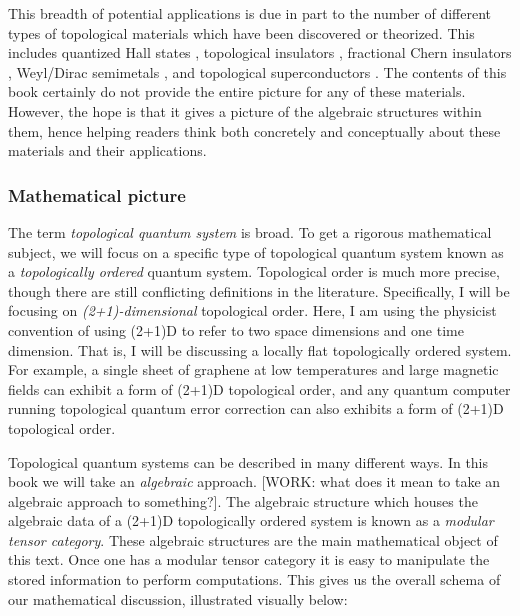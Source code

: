 \documentclass{article}
\theoremstyle{definition}
\newcommand{\0}{\left|0\right>}
\newcommand{\1}{\left|1\right>}
\numberwithin{figure}{section}
\begin{document}
This breadth of potential applications is due in part to the number of different types of topological materials which have been discovered or theorized. This includes quantized Hall states \cite{von202040}, topological insulators \cite{hasan2010colloquium}, fractional Chern insulators \cite{regnault2011fractional}, Weyl/Dirac semimetals \cite{armitage2018weyl}, and topological superconductors \cite{sato2017topological}. The contents of this book certainly do not provide the entire picture for any of these materials. However, the hope is that it gives a picture of the algebraic structures within them, hence helping readers think both concretely and conceptually about these materials and their applications.

\subsubsection{Mathematical picture}

The term \textit{topological quantum system} is broad. To get a rigorous mathematical subject, we will focus on a specific type of topological quantum system known as a \textit{topologically ordered} quantum system. Topological order is much more precise, though there are still conflicting definitions in the literature. Specifically, I will be focusing on \textit{(2+1)-dimensional} topological order. Here, I am using the physicist convention of using (2+1)D to refer to two space dimensions and one time dimension. That is, I will be discussing a locally flat topologically ordered system. For example, a single sheet of graphene at low temperatures and large magnetic fields can exhibit a form of (2+1)D topological order, and any quantum computer running topological quantum error correction can also exhibits a form of (2+1)D topological order.

\begin{center}
\end{center}

Topological quantum systems can be described in many different ways. In this book we will take an \textit{algebraic} approach. [WORK: what does it mean to take an algebraic approach to something?]. The algebraic structure which houses the algebraic data of a (2+1)D topologically ordered system is known as a \textit{modular tensor category}. These algebraic structures are the main mathematical object of this text. Once one has a modular tensor category it is easy to manipulate the stored information to perform computations. This gives us the overall schema of our mathematical discussion, illustrated visually below:
\end{document}
